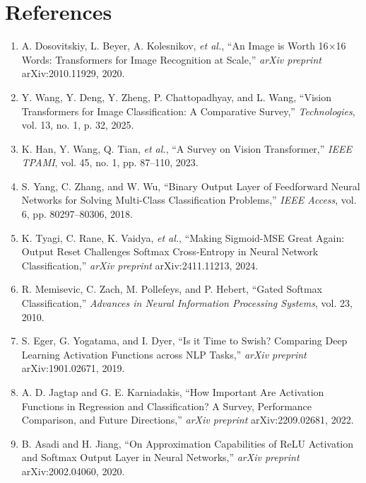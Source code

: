 \section{References}

\begin{enumerate}
\item A. Dosovitskiy, L. Beyer, A. Kolesnikov, \textit{et al.}, ``An Image is Worth 16$\times$16 Words: Transformers for Image Recognition at Scale,'' \textit{arXiv preprint} arXiv:2010.11929, 2020.

\item Y. Wang, Y. Deng, Y. Zheng, P. Chattopadhyay, and L. Wang, ``Vision Transformers for Image Classification: A Comparative Survey,'' \textit{Technologies}, vol. 13, no. 1, p. 32, 2025.

\item K. Han, Y. Wang, Q. Tian, \textit{et al.}, ``A Survey on Vision Transformer,'' \textit{IEEE TPAMI}, vol. 45, no. 1, pp. 87--110, 2023.

\item S. Yang, C. Zhang, and W. Wu, ``Binary Output Layer of Feedforward Neural Networks for Solving Multi-Class Classification Problems,'' \textit{IEEE Access}, vol. 6, pp. 80297--80306, 2018.

\item K. Tyagi, C. Rane, K. Vaidya, \textit{et al.}, ``Making Sigmoid-MSE Great Again: Output Reset Challenges Softmax Cross-Entropy in Neural Network Classification,'' \textit{arXiv preprint} arXiv:2411.11213, 2024.

\item R. Memisevic, C. Zach, M. Pollefeys, and P. Hebert, ``Gated Softmax Classification,'' \textit{Advances in Neural Information Processing Systems}, vol. 23, 2010.

\item S. Eger, G. Yogatama, and I. Dyer, ``Is it Time to Swish? Comparing Deep Learning Activation Functions across NLP Tasks,'' \textit{arXiv preprint} arXiv:1901.02671, 2019.

\item A. D. Jagtap and G. E. Karniadakis, ``How Important Are Activation Functions in Regression and Classification? A Survey, Performance Comparison, and Future Directions,'' \textit{arXiv preprint} arXiv:2209.02681, 2022.

\item B. Asadi and H. Jiang, ``On Approximation Capabilities of ReLU Activation and Softmax Output Layer in Neural Networks,'' \textit{arXiv preprint} arXiv:2002.04060, 2020.


\end{enumerate}
